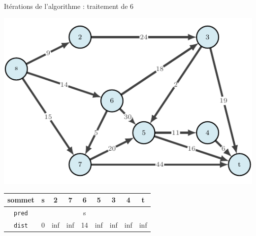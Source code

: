 \begin{frame}{Itérations de l'algorithme : traitement de $6$}
    \begin{center}
        \includegraphics[height=.6\textheight]{fig/ordinal-0.pdf}      
    \begin{tabular}{c|cccccccc}
        
        sommet & s       &2      &7      &6      &5      &3      &4      &t      \\
        \hline
        \texttt{pred} & &       &       &s      &       &       &       &       \\
        \texttt{dist} & 0       &inf    &inf    &14     &inf    &inf    &inf    &inf    \\
    \end{tabular}
\end{center}
\end{frame}

